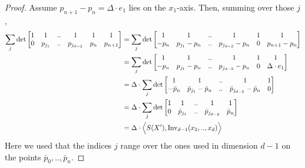 \documentclass{scrartcl}
\theoremstyle{plain}
\theoremstyle{definition}
\newcommand{\R}{\mathbb{R}}
\newcommand{\1}[1]{1_{\{#1\}}}
\newcommand{\ds}{d} %
\begin{document}
\begin{proof}
  Assume $p_{n+1} - p_n = \Delta \cdot e_1$ lies on the $x_1$-axis.
  Then, summing over those $j$,
  \begin{align*}
    \sum_j
     \det\left[
       \begin{matrix}
         1 & 1 & .. & 1 & 1 & 1 \\
         0 & p_{j_1} & .. & p_{j_{\ds-2}} & p_{n} & p_{n+1}
       \end{matrix}
     \right]
    &=
    \sum_j
     \det\left[
       \begin{matrix}
         1             & 1             & .. & 1 & 1 & 1 \\
         - p_n & p_{j_1} - p_n & .. & p_{j_{d-2}} - p_n & 0 & p_{n+1} - p_n
       \end{matrix}
     \right] \\
    &=
    \sum_j
     \det\left[
       \begin{matrix}
         1             & 1             & .. & 1 & 1 & 1 \\
         - p_n & p_{j_1} - p_n & .. & p_{j_{d-2}} - p_n & 0 & \Delta \cdot e_1
       \end{matrix}
     \right] \\
    &=
    \Delta \cdot
    \sum_j
     \det\left[
       \begin{matrix}
         1             & 1             & .. & 1 & 1 \\
         - \bar p_n & \bar p_{j_1} - \bar p_n & .. & \bar p_{j_{d-2}} - \bar p_n & 0
       \end{matrix}
     \right] \\
    &=
    \Delta \cdot
    \sum_j
     \det\left[
       \begin{matrix}
         1             & 1             & .. & 1 & 1 \\
         0 & \bar p_{j_1} & .. & \bar p_{j_{d-2}} & \bar p_n
       \end{matrix}
     \right] \\
     &=
    \Delta
    \cdot
    \Big\langle S(X'), \firstInvariant{\ds-1}(x_2, .., x_\ds) \Big\rangle
  \end{align*}
  Here we used that the indices $j$ range over the ones used in dimension $\ds-1$
  on the points $\bar p_0, .., \bar p_n$.


\end{proof}
\end{document}
